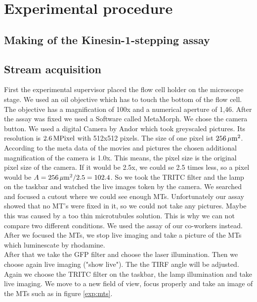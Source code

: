 \section{Experimental procedure}
\subsection{Making of the Kinesin-1-stepping assay}

\subsection{Stream acquisition}
        First the experimental supervisor placed the flow cell holder on the microscope stage. We used an oil objective which has to touch the bottom of the flow cell. The objective has a magnification of 100x and a numerical aperture of 1,46.  
        After the assay was fixed we used a Software called MetaMorph. We chose the camera button. We used a digital Camera by Andor which took greyscaled pictures. Its resolution is $\unit[2.6]{MPixel}$ with 512x512 pixels. The size of one pixel ist $\unit[256]{\mu m^2}$.
        According to the meta data of the movies and pictures the chosen additional magnification of the camera is 1.0x. This means, the pixel size is the original pixel size of the camera. If it would be 2.5x, we could se 2.5 times less, so a pixel would be $A = \unit[256]{\mu m^2} / 2.5 = 102.4$. 
        So we took the TRITC filter and the lamp on the taskbar and watched the live images token by the camera. We searched and focused a cutout where we could see enough MTs. 
        Unfortunately our assay showed that no MT's were fixed in it, so we could not take any pictures. Maybe this was caused by a too thin microtubules solution. This is why we can not compare two different conditions. We used the assay of our co-workers instead. 
        After we focused the MTs, we stop live imaging and take a picture of the MTs which luminescate by rhodamine. \\
        After that we take the GFP filter and choose the laser illumination. Then we choose again live imaging ("show live"). The the TIRF angle will be adjusted.  %
        Again we choose the TRITC filter on the taskbar, the lamp illumination and take live imaging. We move to a new field of view, focus properly and take an image of the MTs such as in figure \ref{exp:mts}.\\
